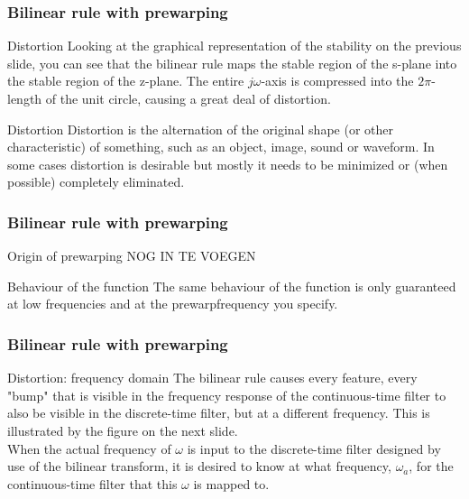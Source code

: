\begin{frame}
	\frametitle{Bilinear rule with prewarping}
	\begin{alertblock}{Distortion}
		Looking at the graphical representation of the stability on the previous slide, you can see that the bilinear rule maps the stable region of the s-plane into the stable region of the z-plane. The entire $j\omega$-axis is compressed into the $2\pi$-length of the unit circle, causing a great deal of distortion.
	\end{alertblock}
	\begin{block}{Distortion}
		Distortion is the alternation of the original shape (or other characteristic) of something, such as an object, image, sound or waveform. In some cases distortion is desirable but mostly it needs to be minimized or (when possible) completely eliminated.
	\end{block}
\end{frame}

\begin{frame}
	\frametitle{Bilinear rule with prewarping}
	\begin{block}{Origin of prewarping}
		NOG IN TE VOEGEN
	\end{block}
	\begin{alertblock}{Behaviour of the function}
		The same behaviour of the function is only guaranteed at low frequencies and at the prewarpfrequency you specify.
	\end{alertblock}
\end{frame}

\begin{frame}
	\frametitle{Bilinear rule with prewarping}
	\begin{block}{Distortion: frequency domain}
		The bilinear rule causes every feature, every "bump" that is visible in the frequency response of the continuous-time filter to also be visible in the discrete-time filter, but at a different frequency. This is illustrated by the figure on the next slide.\\
		\vspace{1em}
		When the actual frequency of $\omega$ is input to the discrete-time filter designed by use of the bilinear transform, it is desired to know at what frequency,  $\omega_a$, for the continuous-time filter that this  $\omega$ is mapped to.
	\end{block}
\end{frame}

